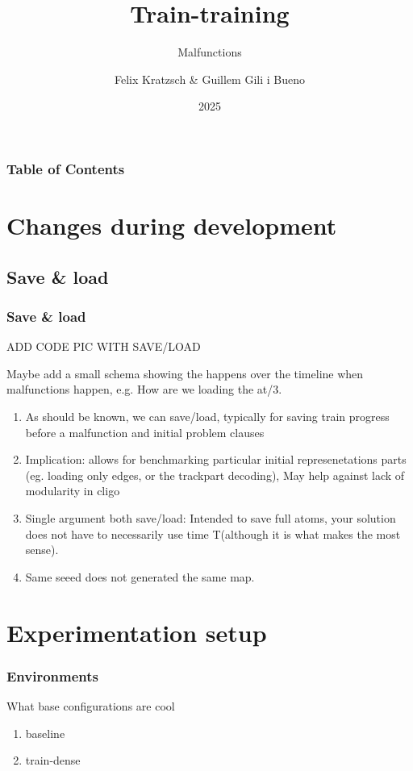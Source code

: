 \documentclass{beamer}
\title{Train-training}
\subtitle{Malfunctions}
\author{Felix  Kratzsch \& Guillem Gili i Bueno  }
\institute{Potsdam University - Railway Scheudling }
\date{2025}
\begin{document}
\frame{\titlepage}

\begin{frame}[label=toc]
\frametitle{Table of Contents}
\tableofcontents[]
\end{frame} 


\section{Changes during development}
\subsection{Save \& load}
\begin{frame}
	\frametitle{Save \& load}
	
	ADD CODE PIC WITH SAVE/LOAD
	
	Maybe add a small schema  showing the happens over the timeline when malfunctions happen, e.g. How are we loading the at/3.
	\begin{enumerate}
	\item{As should be known, we can save/load, typically for saving train progress before a malfunction and initial problem clauses} 
	\item{Implication: allows for benchmarking particular initial represenetations parts (eg. loading only edges, or the trackpart decoding), May help against lack of modularity in cligo}
	\item{Single argument both save/load: Intended to save full atoms, your solution does not have to necessarily use time T(although it is what makes the most sense). }
	\item{Same seeed does not generated the same map. }
	
	 
\end{enumerate}
\end{frame}


\section{Experimentation setup}

\begin{frame}
	\frametitle{Environments}
	What base configurations are cool
	\begin{enumerate}
		\item{baseline} 
		\item{train-dense} 
	\end{enumerate}
	
\end{frame}
\end{document}
